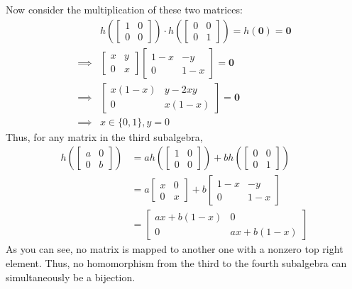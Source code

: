 \documentclass[12pt]{article}
\begin{document}
Now consider the multiplication of these two matrices:
\begin{align*}
             & h\left(\begin{bmatrix}1 & 0 \\ 0 & 0\end{bmatrix}\right)
  \cdot h\left(\begin{bmatrix}0 & 0 \\ 0 & 1\end{bmatrix}\right) = h(\mathbf{0}) = \mathbf{0}                     \\
  \implies{} & \begin{bmatrix}x & y \\0 & x\end{bmatrix}\begin{bmatrix}1-x & -y \\0 & 1-x\end{bmatrix}=\mathbf{0} \\
  \implies{} & \begin{bmatrix}x(1-x) & y-2xy \\ 0 & x(1-x)\end{bmatrix} = \mathbf{0}                              \\
  \implies{} & x \in \{0, 1\}, y=0
\end{align*}
Thus, for any matrix in the third subalgebra,
\begin{align*}
  h\left(\begin{bmatrix}a & 0 \\ 0 & b\end{bmatrix}\right)
   & = ah\left(\begin{bmatrix}1 & 0 \\ 0 & 0\end{bmatrix}\right)
  +bh\left(\begin{bmatrix}0 & 0 \\ 0 & 1\end{bmatrix}\right)     \\
   & = a\begin{bmatrix}x & 0 \\0 & x\end{bmatrix}+b\begin{bmatrix}1-x & -y \\0 & 1-x\end{bmatrix} \\
   &= \begin{bmatrix}ax+b(1-x) & 0 \\ 0 & ax+b(1-x)\end{bmatrix}
\end{align*}
As you can see, no matrix is mapped to another one with a nonzero top right element.
Thus, no homomorphism from the third to the fourth subalgebra can simultaneously
be a bijection.
\end{document}
